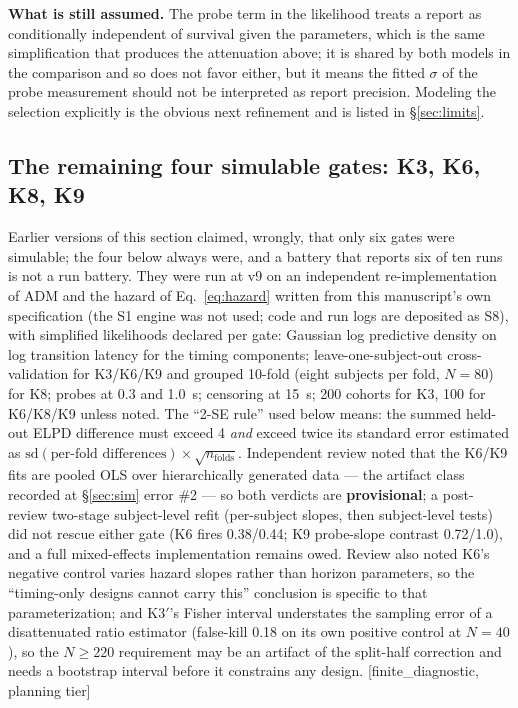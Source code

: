 \documentclass[9pt,twocolumn]{article}
\newcommand{\tier}[1]{{\sffamily\scriptsize\color{RRHMSlate}[#1]}}
\begin{document}
\textbf{What is still assumed.} The probe term in the likelihood treats a report as conditionally independent of survival given the parameters, which is the same simplification that produces the attenuation above; it is shared by both models in the comparison and so does not favor either, but it means the fitted $\sigma$ of the probe measurement should not be interpreted as report precision. Modeling the selection explicitly is the obvious next refinement and is listed in \S\ref{sec:limits}.

\subsection{The remaining four simulable gates: K3, K6, K8, K9}
\label{sec:simremaining}
Earlier versions of this section claimed, wrongly, that only six gates were simulable; the four below always were, and a battery that reports six of ten runs is not a run battery. They were run at v9 on an independent re-implementation of ADM and the hazard of Eq.~\ref{eq:hazard} written from this manuscript's own specification (the S1 engine was not used; code and run logs are deposited as S8), with simplified likelihoods declared per gate: Gaussian log predictive density on log transition latency for the timing components; leave-one-subject-out cross-validation for K3/K6/K9 and grouped 10-fold (eight subjects per fold, $N{=}80$) for K8; probes at 0.3 and 1.0~s; censoring at 15~s; 200 cohorts for K3, 100 for K6/K8/K9 unless noted. The ``2-SE rule'' used below means: the summed held-out ELPD difference must exceed 4 \emph{and} exceed twice its standard error estimated as $\mathrm{sd}(\text{per-fold differences})\times\sqrt{n_{\text{folds}}}$. Independent review noted that the K6/K9 fits are pooled OLS over hierarchically generated data --- the artifact class recorded at \S\ref{sec:sim} error \#2 --- so both verdicts are \textbf{provisional}; a post-review two-stage subject-level refit (per-subject slopes, then subject-level tests) did not rescue either gate (K6 fires 0.38/0.44; K9 probe-slope contrast 0.72/1.0), and a full mixed-effects implementation remains owed. Review also noted K6's negative control varies hazard slopes rather than horizon parameters, so the ``timing-only designs cannot carry this'' conclusion is specific to that parameterization; and K3$'$'s Fisher interval understates the sampling error of a disattenuated ratio estimator (false-kill 0.18 on its own positive control at $N=40$), so the $N\ge220$ requirement may be an artifact of the split-half correction and needs a bootstrap interval before it constrains any design. \tier{finite\_diagnostic, planning tier}
\end{document}
